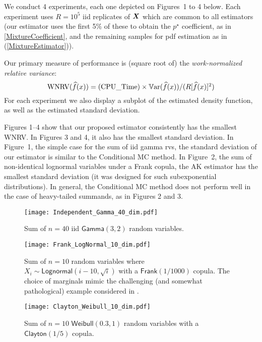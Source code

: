 We conduct 4 experiments, each one depicted on  Figures~1 to 4 below. 
Each experiment uses $R=10^5$ iid replicates of $\boldsymbol{X}$ which are common to all estimators (our estimator uses the first 5\% of these to obtain the $p^\star$ coefficient, as in \eqref{MixtureCoefficient}, and the remaining samples for pdf estimation as in (\ref{MixtureEstimator})). 

Our primary measure of performance is  (square root of) the \emph{work-normalized relative variance}: 
\[\textstyle
 \text{WNRV}(\widehat{f}(x)) = \text{(CPU\_Time)} \times \operatorname{\mathbb{V}\mathrm{ar}}( \widehat{f}(x) ) / (R[\widehat{f}(x)]^2)
\]  
 For each experiment we also display a subplot of the estimated density function, as well as the estimated standard deviation. 

Figures 1--4 show that our proposed estimator consistently has the smallest WNRV. In Figures 3 and 4, it also has the smallest standard deviation. In Figure~1, the simple case for the sum of iid gamma rvs, the standard deviation of our estimator is similar to the Conditional MC method. In Figure~2, the sum of non-identical lognormal variables under a Frank copula, the AK estimator has the smallest standard deviation (it was designed for such subexponential distributions). In general, the Conditional MC method does not perform well in the case of heavy-tailed summands, as in Figures 2 and 3. 

     
    \begin{figure}[H]
		\caption{Sum of $n=40$ iid $\mathsf{Gamma}(3,2)$ random variables.}
    \centering
    \texttt{[image: Independent\_Gamma\_40\_dim.pdf]}\vspace{3mm}
	\end{figure}



 \begin{figure}[H]
		\caption{    Sum of $n=10$ random variables where $X_i \sim \mathsf{Lognormal}(i-10,\sqrt{i})$ with a $\mathsf{Frank}(1/1000)$ copula. The choice of marginals mimic the challenging (and somewhat pathological) example considered in \cite{asmussen2011efficient}.}\vspace{5mm}
    \centering
    \texttt{[image: Frank\_LogNormal\_10\_dim.pdf]}\vspace{3mm}
    \end{figure}


 

    \begin{figure}[H]
				\caption{    Sum of $n=10$ $\mathsf{Weibull}(0.3, 1)$ random variables with a $\mathsf{Clayton}(1/5)$ copula.}\vspace{3mm}
    \centering
    \texttt{[image: Clayton\_Weibull\_10\_dim.pdf]}
		\label{Test:Clayton}
    \end{figure}



